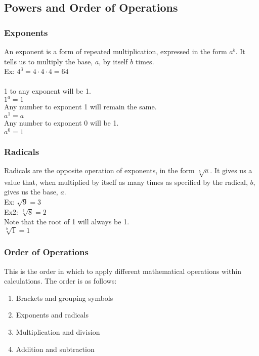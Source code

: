 \subsection{Powers and Order of Operations}

\subsubsection{Exponents}
An exponent is a form of repeated multiplication, expressed in the form $a^b$. It tells us to multiply the base, $a$, by itself $b$ times.\\
Ex: $4^3=4\cdot 4\cdot 4=64$\\
\\
1 to any exponent will be 1.\\
$1^a=1$\\
Any number to exponent 1 will remain the same.\\
$a^1=a$\\
Any number to exponent 0 will be 1.\\
$a^0=1$

\subsubsection{Radicals}
Radicals are the opposite operation of exponents, in the form $\sqrt[b]{a}$. It gives us a value that, when multiplied by itself as many times as specified by the radical, $b$, gives us the base, $a$.\\
Ex: $\sqrt{9}=3$\\
Ex2: $\sqrt[3]{8}=2$\\
Note that the root of 1 will always be 1.\\
$\sqrt[b]{1}=1$

\subsubsection{Order of Operations}
This is the order in which to apply different mathematical operations within calculations. The order is as follows:
\begin{enumerate}
    \item Brackets and grouping symbols
    \item Exponents and radicals
    \item Multiplication and division
    \item Addition and subtraction
\end{enumerate}

